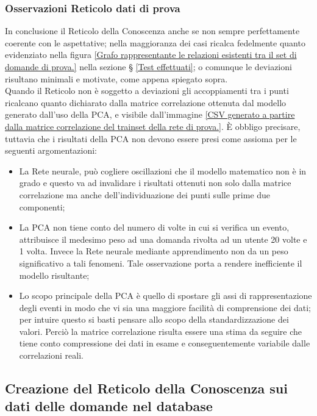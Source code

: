 \subsubsection{Osservazioni Reticolo dati di prova}
In conclusione il Reticolo della Conoscenza anche se non sempre perfettamente coerente con le aspettative; nella maggioranza dei casi ricalca fedelmente quanto evidenziato nella figura \ref{Grafo rappresentante le relazioni esistenti tra il set di domande di prova.} nella sezione § \ref{Test effettuati}; o comunque le deviazioni risultano minimali e motivate, come appena spiegato sopra. \\
Quando il Reticolo non \`e soggetto a deviazioni gli accoppiamenti tra i punti ricalcano quanto dichiarato dalla matrice correlazione ottenuta dal modello generato dall'uso della PCA, e visibile dall'immagine \ref{CSV generato a partire dalla matrice correlazione del trainset della rete di prova.}.
\`E obbligo precisare, tuttavia che i risultati della PCA non devono essere presi come assioma per le seguenti argomentazioni:
\begin{itemize} 
\item La Rete neurale, pu\`o cogliere oscillazioni che il modello matematico non \`e in grado e questo va ad invalidare i risultati ottenuti non solo dalla matrice correlazione ma anche dell'individuazione dei punti sulle prime due componenti;
\item La PCA non tiene conto del numero di volte in cui si verifica un evento, attribuisce il medesimo peso ad una domanda rivolta ad un utente 20 volte e 1 volta. Invece la Rete neurale mediante apprendimento non da un peso significativo a tali fenomeni. Tale osservazione porta a rendere inefficiente il modello risultante;
\item Lo scopo principale della PCA \`e quello di spostare gli assi di rappresentazione degli eventi in modo che vi sia una maggiore facilit\`a di comprensione dei dati; per intuire questo si basti pensare allo scopo della standardizzazione dei valori. Perci\`o la matrice correlazione risulta essere una stima da seguire che tiene conto compressione dei dati in esame e conseguentemente variabile dalle correlazioni reali.
\end{itemize}

\subsection{Creazione del Reticolo della Conoscenza sui dati delle domande nel database}
\label{Creazione del Reticolo della Conoscenza sui dati delle domande nel database}

